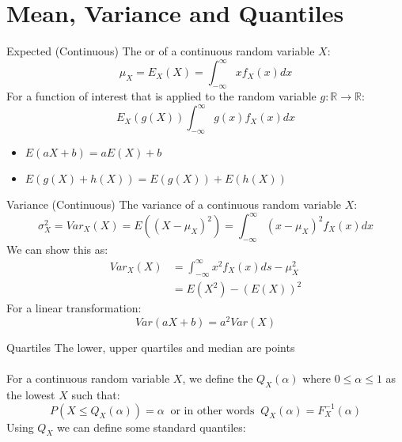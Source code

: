 \section{Mean, Variance and Quantiles}
\begin{definitionbox}{Expected (Continuous)}
	The  or  of a continuous random variable $X$:
	\[\mu_X = E_X(X) = \int_{-\infty}^{\infty}xf_X(x)dx\]
	For a function of interest that is applied to the random variable $g : \mathbb{R} \to \mathbb{R}$:
	\[E_X(g(X))  \int_{-\infty}^{\infty}g(x)f_X(x)dx\]
	\begin{itemize}
		\item $E(aX + b) = aE(X) + b$
		\item $E(g(X) + h(X)) = E(g(X)) + E(h(X))$
    \end{itemize}
\end{definitionbox}
\begin{definitionbox}{Variance (Continuous)}
	The variance of a continuous random variable $X$:
	\[\sigma^2_X = Var_X(X) = E((X - \mu_X)^2) = \int_{-\infty}^{\infty}(x - \mu_X)^2f_X(x)dx\]
	We can show this as:
	\[
		\begin{split}
			Var_X(X) & = \int_{-\infty}^{\infty}x^2f_X(x)ds - \mu_X^2 \\
			& = E(X^2) - (E(X))^2
		\end{split}\]
	For a linear transformation:
	\[Var(aX + b) = a^2Var(X)\]
\end{definitionbox}
\begin{definitionbox}{Quartiles}
The lower, upper quartiles and median are points
\\
\\ For a continuous random variable $X$, we define the  $Q_X(\alpha)$ where $0 \leq \alpha \leq 1$ as the lowest $X$ such that:
\[P(X \leq Q_X(\alpha)) = \alpha \ \text{ or in other words } \ Q_X(\alpha) = F_X^{-1}(\alpha)\]
Using $Q_X$ we can define some standard quantiles:
\begin{itemize}
\end{itemize}
\end{definitionbox}
